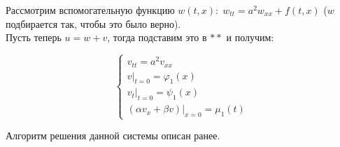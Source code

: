 Рассмотрим вспомогательную функцию $w(t,x): \; w_{tt} = a^2 w_{xx} + f(t,x)$ ($w$ подбирается так, чтобы это было верно).\\

Пусть теперь $u = w + v$, тогда подставим это в $**$ и получим:

$$\begin{cases}
	v_{tt} = a^2 v_{xx}\\
	v|_{t=0} = \varphi_1 (x) \\
	v_t |_{t=0} = \psi_1 (x) \\
	(\alpha v_x + \beta v)|_{x=0} = \mu_1 (t)
\end{cases}$$

Алгоритм решения данной системы описан ранее.

